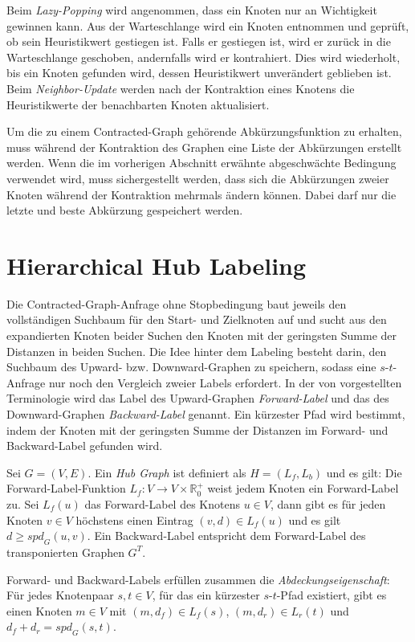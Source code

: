 Beim \emph{Lazy-Popping} wird angenommen, dass ein Knoten nur an Wichtigkeit gewinnen kann.
Aus der Warteschlange wird ein Knoten entnommen und geprüft, ob sein Heuristikwert gestiegen ist.
Falls er gestiegen ist, wird er zurück in die Warteschlange geschoben, andernfalls wird er kontrahiert.
Dies wird wiederholt, bis ein Knoten gefunden wird, dessen Heuristikwert unverändert geblieben ist.
Beim \emph{Neighbor-Update} werden nach der Kontraktion eines Knotens die Heuristikwerte der benachbarten Knoten aktualisiert.

Um die zu einem Contracted-Graph gehörende Abkürzungsfunktion zu erhalten, muss während der Kontraktion des Graphen eine Liste der Abkürzungen erstellt werden.
Wenn die im vorherigen Abschnitt erwähnte abgeschwächte Bedingung verwendet wird, muss sichergestellt werden, dass sich die Abkürzungen zweier Knoten während der Kontraktion mehrmals ändern können.
Dabei darf nur die letzte und beste Abkürzung gespeichert werden.

\section{Hierarchical Hub Labeling}\label{chapter:hl}

Die Contracted-Graph-Anfrage ohne Stopbedingung baut jeweils den vollständigen Suchbaum für den Start- und Zielknoten auf und sucht aus den expandierten Knoten beider Suchen den Knoten mit der geringsten Summe der Distanzen in beiden Suchen.
Die Idee hinter dem Labeling besteht darin, den Suchbaum des Upward- bzw. Downward-Graphen zu speichern, sodass eine $s$-$t$-Anfrage nur noch den Vergleich zweier Labels erfordert.
In der von \cite{abraham2011hub} vorgestellten Terminologie wird das Label des Upward-Graphen \emph{Forward-Label} und das des Downward-Graphen \emph{Backward-Label} genannt.
Ein kürzester Pfad wird bestimmt, indem der Knoten mit der geringsten Summe der Distanzen im Forward- und Backward-Label gefunden wird.

\begin{definition}
  Sei $G = (V, E)$.
  Ein \emph{Hub Graph} ist definiert als $H = (L_f, L_b)$ und es gilt:
  Die Forward-Label-Funktion $L_f \colon V \to V \times \mathbb{R}^+_0$ weist jedem Knoten ein Forward-Label zu.
  Sei $L_f(u)$ das Forward-Label des Knotens $u \in V$, dann gibt es für jeden Knoten $v \in V$ höchstens einen Eintrag $(v, d) \in L_f(u)$ und es gilt $d \geq {spd}_G(u, v)$.
  Ein Backward-Label entspricht dem Forward-Label des transponierten Graphen $G^T$.

  Forward- und Backward-Labels erfüllen zusammen die \emph{Abdeckungseigenschaft}:
  Für jedes Knotenpaar $s, t \in V$, für das ein kürzester $s$-$t$-Pfad existiert, gibt es einen Knoten $m \in V$ mit $(m, d_f) \in L_f(s)$, $(m, d_r) \in L_r(t)$ und $d_f + d_r = {spd}_G(s, t)$.
\end{definition}

